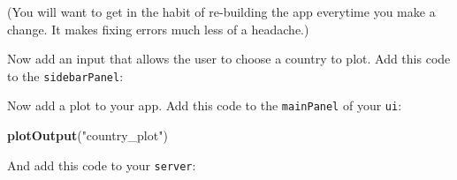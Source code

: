 \documentclass[]{book}
\newenvironment{Shaded}{\begin{snugshade}}{\end{snugshade}}
\newcommand{\DataTypeTok}[1]{\textcolor[rgb]{0.13,0.29,0.53}{#1}}
\newcommand{\KeywordTok}[1]{\textcolor[rgb]{0.13,0.29,0.53}{\textbf{#1}}}
\newcommand{\NormalTok}[1]{#1}
\newcommand{\OperatorTok}[1]{\textcolor[rgb]{0.81,0.36,0.00}{\textbf{#1}}}
\newcommand{\StringTok}[1]{\textcolor[rgb]{0.31,0.60,0.02}{#1}}
\begin{document}
(You will want to get in the habit of re-building the app everytime you make a change. It makes fixing errors much less of a headache.)

Now add an input that allows the user to choose a country to plot. Add this code to the \texttt{sidebarPanel}:

\begin{Shaded}
\end{Shaded}

Now add a plot to your app. Add this code to the \texttt{mainPanel} of your \texttt{ui}:

\begin{Shaded}
\begin{Highlighting}[]
\KeywordTok{plotOutput}\NormalTok{(}\StringTok{"country_plot"}\NormalTok{)}
\end{Highlighting}
\end{Shaded}

And add this code to your \texttt{server}:

\begin{Shaded}
\end{Shaded}
\end{document}
